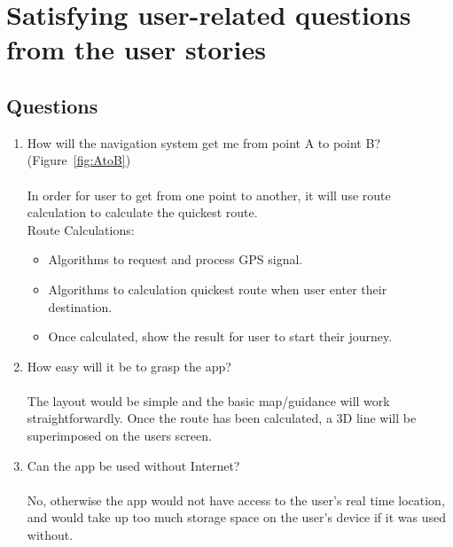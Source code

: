 \newpage

\section{Satisfying user-related questions from the user stories}
\subsection*{Questions}
\begin{enumerate}
    \item How will the navigation system get me from point A to point B? (Figure~\ref{fig:AtoB})\\\\
    In order for user to get from one point to another, it will use route calculation to calculate the quickest route.\\
    Route Calculations:
    \begin{itemize}
        \item Algorithms to request and process GPS signal.
        \item Algorithms to calculation quickest route when user enter their destination.
        \item Once calculated, show the result for user to start their journey.
    \end{itemize}
    
    \item How easy will it be to grasp the app?\\\\
    The layout would be simple and the basic map/guidance will work straightforwardly. Once the route has been calculated, a 3D line will be superimposed on the users screen.
    
    
    \item Can the app be used without Internet? \\\\
    No, otherwise the app would not have access to the user's real time location, and would take up too much storage space on the user's device if it was used without.
\end{enumerate}

